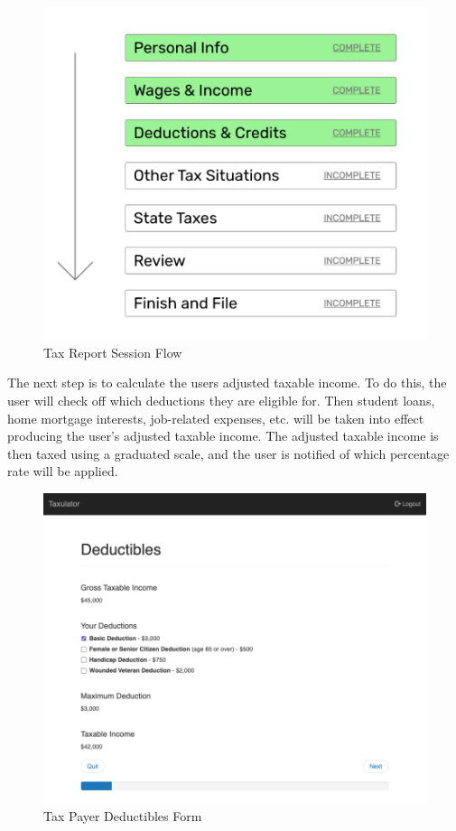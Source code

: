 \documentclass[sigconf]{acmart}
\begin{document}
\begin{figure}[H]
  \label{UserFlow}
  \centering
  \includegraphics[width=\linewidth]{Images/UserFlow.png}
  \caption{Tax Report Session Flow}
\end{figure}

The next step is to calculate the users adjusted taxable income. To do this, the user will check off which deductions they are eligible for. Then student loans, home mortgage interests, job-related expenses, etc. will be taken into effect producing the user’s adjusted taxable income. The adjusted taxable income is then taxed using a graduated scale, and the user is notified of which percentage rate will be applied.

\begin{figure}[H]
  \centering
  \includegraphics[width=\linewidth]{Images/Form2.png}
  \caption{Tax Payer Deductibles Form}
  \label{TaxableIncome}
\end{figure}
\end{document}
